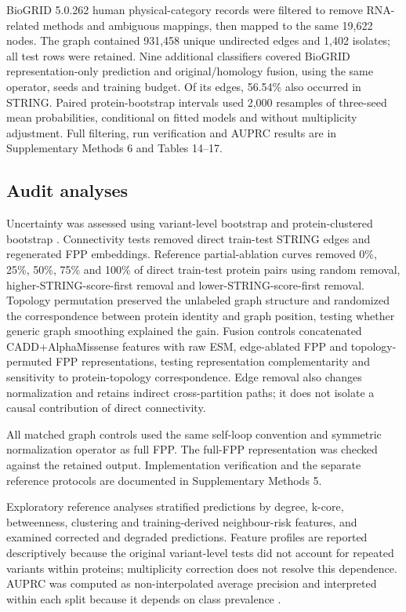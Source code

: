 \documentclass[conference]{IEEEtran}
\newcommand{\CADDAM}{CADD\allowbreak{}+\allowbreak{}AlphaMissense}
\begin{document}
BioGRID 5.0.262 human physical-category records \cite{Stark2006BioGRID} were filtered to remove RNA-related methods and ambiguous mappings, then mapped to the same 19,622 nodes. The graph contained 931,458 unique undirected edges and 1,402 isolates; all test rows were retained. Nine additional classifiers covered BioGRID representation-only prediction and original/homology fusion, using the same operator, seeds and training budget. Of its edges, 56.54\% also occurred in STRING. Paired protein-bootstrap intervals used 2,000 resamples of three-seed mean probabilities, conditional on fitted models and without multiplicity adjustment. Full filtering, run verification and AUPRC results are in Supplementary Methods 6 and Tables 14--17.

\subsection{Audit analyses}

Uncertainty was assessed using variant-level bootstrap and protein-clustered bootstrap \cite{Efron1993Bootstrap}. Connectivity tests removed direct train-test STRING edges and regenerated FPP embeddings. Reference partial-ablation curves removed 0\%, 25\%, 50\%, 75\% and 100\% of direct train-test protein pairs using random removal, higher-STRING-score-first removal and lower-STRING-score-first removal. Topology permutation preserved the unlabeled graph structure and randomized the correspondence between protein identity and graph position, testing whether generic graph smoothing explained the gain. Fusion controls concatenated \CADDAM{} features with raw ESM, edge-ablated FPP and topology-permuted FPP representations, testing representation complementarity and sensitivity to protein-topology correspondence. Edge removal also changes normalization and retains indirect cross-partition paths; it does not isolate a causal contribution of direct connectivity.

All matched graph controls used the same self-loop convention and symmetric normalization operator as full FPP. The full-FPP representation was checked against the retained output. Implementation verification and the separate reference protocols are documented in Supplementary Methods 5.

Exploratory reference analyses stratified predictions by degree, k-core, betweenness, clustering and training-derived neighbour-risk features, and examined corrected and degraded predictions. Feature profiles are reported descriptively because the original variant-level tests did not account for repeated variants within proteins; multiplicity correction \cite{Benjamini1995FDR} does not resolve this dependence. AUPRC was computed as non-interpolated average precision and interpreted within each split because it depends on class prevalence \cite{Saito2015PrecisionRecall}.
\end{document}
